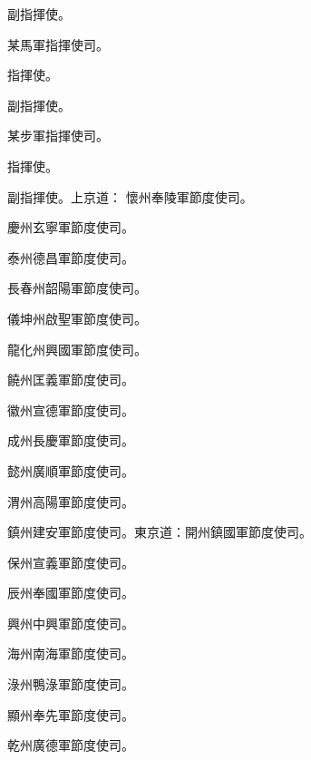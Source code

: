 \begin{pinyinscope}
 副指揮使。



 某馬軍指揮使司。



 指揮使。



 副指揮使。



 某步軍指揮使司。



 指揮使。



 副指揮使。上京道：
 懷州奉陵軍節度使司。



 慶州玄寧軍節度使司。



 泰州德昌軍節度使司。



 長春州韶陽軍節度使司。



 儀坤州啟聖軍節度使司。



 龍化州興國軍節度使司。



 饒州匡義軍節度使司。



 徽州宣德軍節度使司。



 成州長慶軍節度使司。



 懿州廣順軍節度使司。



 渭州高陽軍節度使司。



 鎮州建安軍節度使司。東京道：開州鎮國軍節度使司。



 保州宣義軍節度使司。



 辰州奉國軍節度使司。



 興州中興軍節度使司。



 海州南海軍節度使司。



 淥州鴨淥軍節度使司。



 顯州奉先軍節度使司。



 乾州廣德軍節度使司。




\end{pinyinscope}
